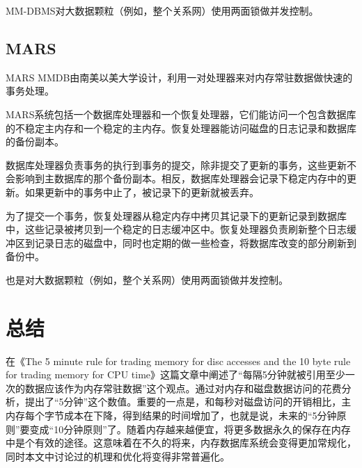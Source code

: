 \documentclass[translation]{zjutreport}
\begin{document}
MM-DBMS对大数据颗粒（例如，整个关系网）使用两面锁做并发控制。

\section{MARS}
MARS MMDB由南美以美大学设计，利用一对处理器来对内存常驻数据做快速的事务处理。

MARS系统包括一个数据库处理器和一个恢复处理器，它们能访问一个包含数据库的不稳定主内存和一个稳定的主内存。恢复处理器能访问磁盘的日志记录和数据库的备份副本。

数据库处理器负责事务的执行到事务的提交，除非提交了更新的事务，这些更新不会影响到主数据库的那个备份副本。相反，数据库处理器会记录下稳定内存中的更新。如果更新中的事务中止了，被记录下的更新就被丢弃。

为了提交一个事务，恢复处理器从稳定内存中拷贝其记录下的更新记录到数据库中，这些记录被拷贝到一个稳定的日志缓冲区中。恢复处理器负责刷新整个日志缓冲区到记录日志的磁盘中，同时也定期的做一些检查，将数据库改变的部分刷新到备份中。

也是对大数据颗粒（例如，整个关系网）使用两面锁做并发控制。

\chapter{总结}
在《The 5 minute rule for trading memory for disc 
accesses and the 10 byte rule for trading memory for CPU time》这篇文章中阐述了“每隔5分钟就被引用至少一次的数据应该作为内存常驻数据”这个观点。通过对内存和磁盘数据访问的花费分析，提出了“5分钟”这个数值。重要的一点是，和每秒对磁盘访问的开销相比，主内存每个字节成本在下降，得到结果的时间增加了，也就是说，未来的“5分钟原则”要变成“10分钟原则”了。随着内存越来越便宜，将更多数据永久的保存在内存中是个有效的途径。这意味着在不久的将来，内存数据库系统会变得更加常规化，同时本文中讨论过的机理和优化将变得非常普遍化。

\backmatter %
\endgroup %



\clearpage %

\nocite{*}                                   %


\end{document}
